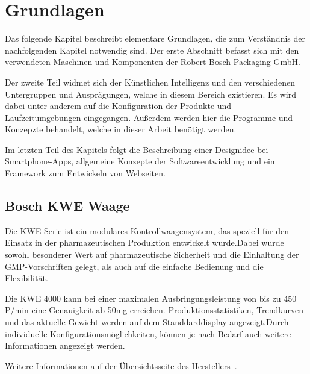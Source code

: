 \chapter{Grundlagen}
\label{ch:grundlagen}
Das folgende Kapitel beschreibt elementare Grundlagen, die zum Verständnis der nachfolgenden Kapitel notwendig sind. Der
erste Abschnitt befasst sich mit den verwendeten Maschinen und Komponenten der Robert Bosch Packaging GmbH.

Der zweite Teil widmet sich der Künstlichen Intelligenz und den verschiedenen Untergruppen und Ausprägungen, welche in
diesem Bereich existieren. Es wird dabei unter anderem auf die Konfiguration der Produkte und Laufzeitumgebungen
eingegangen. Außerdem werden hier die Programme und Konzepzte behandelt, welche in dieser Arbeit benötigt werden.

Im letzten Teil des Kapitels folgt die Beschreibung einer Designidee bei Smartphone-Apps, allgemeine Konzepte der
Softwareentwicklung und ein Framework zum Entwickeln von Webseiten.

\section{Bosch KWE Waage}
Die KWE Serie ist ein modulares Kontrollwaagensystem, das speziell für den Einsatz in der pharmazeutischen
Produktion entwickelt wurde.Dabei wurde sowohl besonderer Wert auf pharmazeutische Sicherheit und die Einhaltung der
GMP-Vorschriften gelegt, als auch auf die einfache Bedienung und die Flexibilität.

Die KWE 4000 kann bei einer maximalen Ausbringungsleistung von bis zu 450 P/min eine Genauigkeit ab 50mg erreichen.
Produktionsstatistiken, Trendkurven und das aktuelle Gewicht werden auf dem Standdarddisplay angezeigt.Durch individuelle
Konfigurationsmöglichkeiten, können je nach Bedarf auch weitere Informationen angezeigt werden.

Weitere Informationen auf der Übersichtsseite des Herstellers~\cite{online_grundlagen_boschkwe}.

